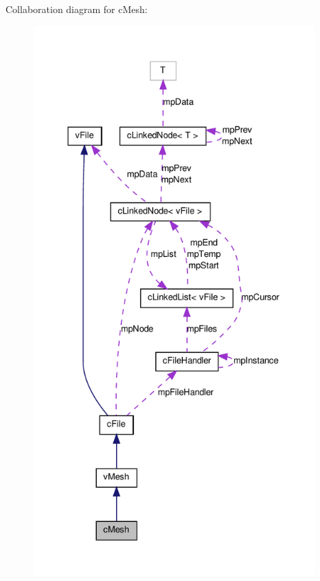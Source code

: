 Collaboration diagram for cMesh:
\nopagebreak
\begin{figure}[H]
\begin{center}
\leavevmode
\includegraphics[height=600pt]{classc_mesh__coll__graph}
\end{center}
\end{figure}
